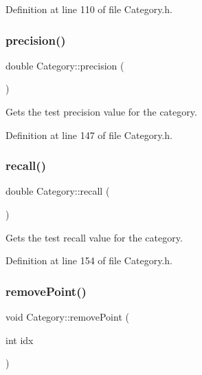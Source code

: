 Definition at line 110 of file Category.\+h.

\mbox{\label{class_category_aba83338fa764aa9d9157de0f2c24b07f}} 
\subsubsection{\texorpdfstring{precision()}{precision()}}
{\footnotesize\ttfamily double Category\+::precision (\begin{DoxyParamCaption}{ }\end{DoxyParamCaption})\hspace{0.3cm}{\ttfamily [inline]}}

Gets the test precision value for the category. 

Definition at line 147 of file Category.\+h.

\mbox{\label{class_category_a778001a2865033dbfb99fcc136815295}} 
\subsubsection{\texorpdfstring{recall()}{recall()}}
{\footnotesize\ttfamily double Category\+::recall (\begin{DoxyParamCaption}{ }\end{DoxyParamCaption})\hspace{0.3cm}{\ttfamily [inline]}}

Gets the test recall value for the category. 

Definition at line 154 of file Category.\+h.

\mbox{\label{class_category_a213b1e03615488e5ef9ddd6189f8dc16}} 
\subsubsection{\texorpdfstring{remove\+Point()}{removePoint()}}
{\footnotesize\ttfamily void Category\+::remove\+Point (\begin{DoxyParamCaption}\item[{int}]{idx }\end{DoxyParamCaption})}


